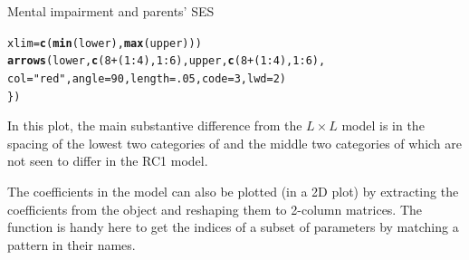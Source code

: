 \documentclass[11pt]{book}\usepackage[]{graphicx}\usepackage[]{color}
\makeatletter
\newcommand{\hlnum}[1]{\textcolor[rgb]{0.686,0.059,0.569}{#1}}%
\newcommand{\hlstr}[1]{\textcolor[rgb]{0.192,0.494,0.8}{#1}}%
\newcommand{\hlopt}[1]{\textcolor[rgb]{0,0,0}{#1}}%
\newcommand{\hlstd}[1]{\textcolor[rgb]{0.345,0.345,0.345}{#1}}%
\newcommand{\hlkwc}[1]{\textcolor[rgb]{0.333,0.667,0.333}{#1}}%
\newcommand{\hlkwd}[1]{\textcolor[rgb]{0.737,0.353,0.396}{\textbf{#1}}}%
\newenvironment{kframe}{%
 \def\at@end@of@kframe{}%
 \ifinner\ifhmode%
  \def\at@end@of@kframe{\end{minipage}}%
  \begin{minipage}{\columnwidth}%
 \fi\fi%
 \def\FrameCommand##1{\hskip\@totalleftmargin \hskip-\fboxsep
 \colorbox{shadecolor}{##1}\hskip-\fboxsep
     \hskip-\linewidth \hskip-\@totalleftmargin \hskip\columnwidth}%
 \MakeFramed {\advance\hsize-\width
   \@totalleftmargin\z@ \linewidth\hsize
   \@setminipage}}%
 {\par\unskip\endMakeFramed%
 \at@end@of@kframe}
\newenvironment{knitrout}{}{} %
\renewenvironment{knitrout}{\small\renewcommand{\baselinestretch}{.85}}{} %
\makeatother
\begin{document}
\begin{Example}[mental5]{Mental impairment and parents' SES}
\begin{knitrout}
\begin{kframe}
\begin{alltt}
           \hlkwc{xlim}\hlstd{=}\hlkwd{c}\hlstd{(}\hlkwd{min}\hlstd{(lower),} \hlkwd{max}\hlstd{(upper)))}
  \hlkwd{arrows}\hlstd{(lower,} \hlkwd{c}\hlstd{(}\hlnum{8}\hlopt{+}\hlstd{(}\hlnum{1}\hlopt{:}\hlnum{4}\hlstd{),} \hlnum{1}\hlopt{:}\hlnum{6}\hlstd{), upper,} \hlkwd{c}\hlstd{(}\hlnum{8}\hlopt{+}\hlstd{(}\hlnum{1}\hlopt{:}\hlnum{4}\hlstd{),} \hlnum{1}\hlopt{:}\hlnum{6}\hlstd{),}
         \hlkwc{col}\hlstd{=}\hlstr{"red"}\hlstd{,} \hlkwc{angle}\hlstd{=}\hlnum{90}\hlstd{,} \hlkwc{length}\hlstd{=}\hlnum{.05}\hlstd{,} \hlkwc{code}\hlstd{=}\hlnum{3}\hlstd{,} \hlkwc{lwd}\hlstd{=}\hlnum{2}\hlstd{)}
  \hlstd{\})}
\end{alltt}
\end{kframe}
\end{knitrout}
In this plot, the main substantive difference from the $L \times L$
model is in the spacing of the lowest two categories of 
and the middle two categories of  which are not
seen to differ in the RC1 model.

The coefficients in the   model can also be plotted (in a 2D plot)
by extracting the coefficients from the  object and
reshaping them to 2-column matrices.  The function 
is handy here to get the indices of a subset of parameters by
matching a pattern in their names. 


\end{Example}
\end{document}

